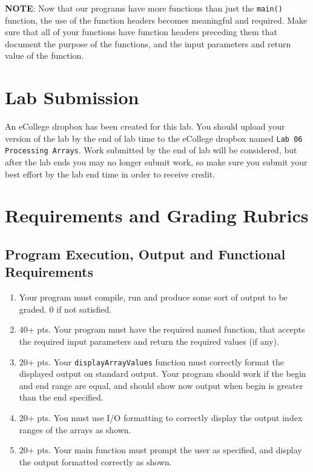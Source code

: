\documentclass[11pt]{article}
\begin{document}
\textbf{NOTE}: Now that our programs have more functions than just the
\verb~main()~ function, the use of the function headers becomes meaningful
and required.  Make sure that all of your functions have function
headers preceding them that document the purpose of the functions, and
the input parameters and return value of the function.
\section*{Lab Submission}
\label{sec-4}

An eCollege dropbox has been created for this lab.  You should
upload your version of the lab by the end of lab time to the eCollege
dropbox named \verb~Lab 06 Processing Arrays~.  Work submitted by the end
of lab will be considered, but after the lab ends you may no longer
submit work, so make sure you submit your best effort by the lab end
time in order to receive credit.
\section*{Requirements and Grading Rubrics}
\label{sec-5}

\subsection*{Program Execution, Output and Functional Requirements}
\label{sec-5-1}

\begin{enumerate}
\item Your program must compile, run and produce some sort of output to be
graded. 0 if not satisfied.
\item 40+ pts.  Your program must have the required named function,
that accepts the required input parameters and return the required
values (if any).
\item 20+ pts. Your \verb~displayArrayValues~ function must correctly format
the displayed output on standard output.  Your program should work
if the begin and end range are equal, and should show now output
when begin is greater than the end specified.
\item 20+ pts.  You must use I/O formatting to correctly display the
output index ranges of the arrays as shown.
\item 20+ pts. Your main function must prompt the user as specified, and
display the output formatted correctly as shown.
\end{enumerate}
\end{document}
